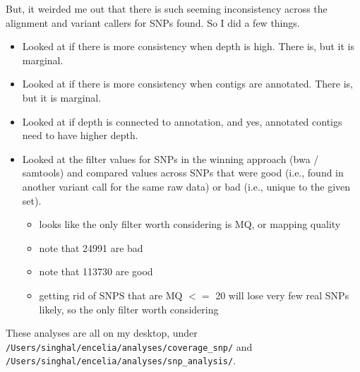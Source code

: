\documentclass[idxtotoc,hyperref,openany,oneside]{labbook} %
\begin{document}
But, it weirded me out that there is such seeming inconsistency across the alignment and variant callers for SNPs found. So I did a few things.
\begin{itemize}
\item Looked at if there is more consistency when depth is high. There is, but it is marginal.
\item Looked at if there is more consistency when contigs are annotated. There is, but it is marginal.
\item Looked at if depth is connected to annotation, and yes, annotated contigs need to have higher depth.
\item Looked at the filter values for SNPs in the winning approach (bwa / samtools) and compared values across SNPs that were good (i.e., found in another variant call for the same raw data) or bad (i.e., unique to the given set).
\begin{itemize}
\item looks like the only filter worth considering is MQ, or mapping quality
\item note that 24991 are bad
\item note that 113730 are good
\item getting rid of SNPS that are MQ $<=$ 20 will lose very few real SNPs likely, so the only filter worth considering
\end{itemize}
\end{itemize}
These analyses are all on my desktop, under \verb+/Users/singhal/encelia/analyses/coverage_snp/+ and \verb+/Users/singhal/encelia/analyses/snp_analysis/+.
\end{document}
